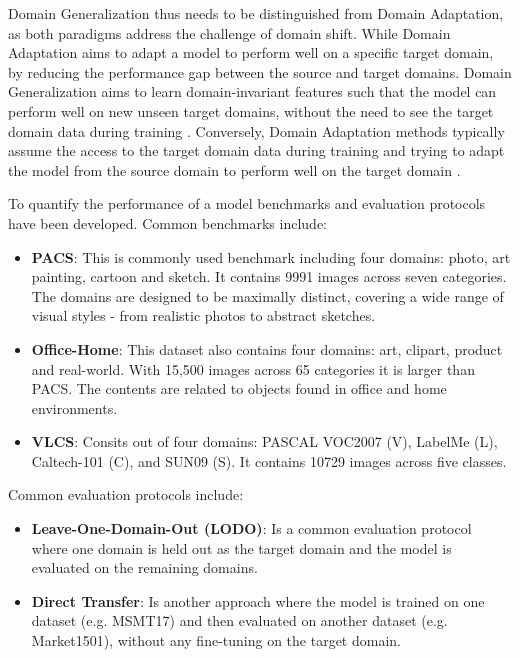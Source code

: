Domain Generalization thus needs to be distinguished from Domain Adaptation, as both paradigms address the challenge of domain shift. While Domain Adaptation aims to adapt a model to perform well on a specific target domain, by reducing the performance gap between the source and target domains. Domain Generalization aims to learn domain-invariant features such that the model can perform well on new unseen target domains, without the need to see the target domain data during training \cite{liDeeperBroaderArtier2017}. Conversely, Domain Adaptation methods typically assume the access to the target domain data during training and trying to adapt the model from the source domain to perform well on the target domain \cite{liuDEJAVUContinual2023, wangDeepVisualDomain2018}. 

To quantify the performance of a model benchmarks and evaluation protocols have been developed. Common benchmarks include:
\begin{itemize}
    \item \textbf{PACS}: \cite{liDeeperBroaderArtier2017} This is commonly used benchmark including four domains: photo, art painting, cartoon and sketch. It contains 9991 images across seven categories. The domains are designed to be maximally distinct, covering a wide range of visual styles - from realistic photos to abstract sketches.
    \item \textbf{Office-Home}: \cite{venkateswaraDeepHashingNetwork2017} This dataset also contains four domains: art, clipart, product and real-world. With 15,500 images across 65 categories it is larger than PACS. The contents are related to objects found in office and home environments.
    \item \textbf{VLCS}: Consits out of four domains: PASCAL VOC2007 (V), LabelMe (L), Caltech-101 (C), and SUN09 (S). It contains 10729 images across five classes. %

\end{itemize}
Common evaluation protocols include:
\begin{itemize}
    \item \textbf{Leave-One-Domain-Out (LODO)}: Is a common evaluation protocol where one domain is held out as the target domain and the model is evaluated on the remaining domains. \cite{liDeeperBroaderArtier2017}
    \item \textbf{Direct Transfer}: Is another approach where the model is trained on one dataset (e.g. MSMT17) and then evaluated on another dataset (e.g. Market1501), without any fine-tuning on the target domain. \cite{chongLearningDomainInvariant2021}
\end{itemize}

